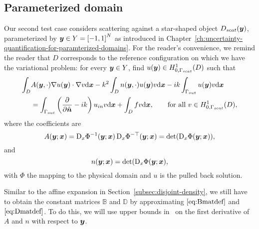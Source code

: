 \subsection{Parameterized domain}\label{subsec:parameterized-domain}
Our second test case considers scattering against a star-shaped object $D_{scat}({\bm{y}})$, parameterized by ${\bm{y}}\in Y = \left[ -1,1 \right]^N$ as introduced in Chapter~\ref{ch:uncertainty-quantification-for-paramterized-domains}.
For the reader's convenience, we remind the reader that $D$ corresponds to the reference configuration on which we have the variational problem: for every ${\bm{y}}\in Y$, find $u({\bm{y}}) \in H^1_{0, \Gamma_{scat}}(D)$ such that
\begin{align*}
    \int_{D}& A({\bm{y}},\cdot) \nabla u({\bm{y}}) \cdot \nabla v \mathrm{d}{{\bm{x}}} - k^2\int_{D} n({\bm{y}},\cdot) u({\bm{y}}) v \mathrm{d}{{\bm{x}}} - i k\int_{\Gamma_{out}}  u({\bm{y}}) v\mathrm{d}{{\bm{x}}} \\
    &= \int_{\Gamma_{out}} \left( \frac{\partial}{\partial \hat{\bm{n}}} -ik\right)u_{in} v\mathrm{d}{{\bm{x}}} +  \int_{D} f v\mathrm{d}{{\bm{x}}}, \nonumber
    \text{\qquad for all }v \in H^1_{0, \Gamma_{scat}}(D),
\end{align*}
where the coefficients are
\begin{equation*}
    A({\bm{y}}; {{\bm{x}}}) =  \mathop{}\!\mathrm{D}_x\Phi^{-1}({\bm{y}}; {{\bm{x}}}) \mathop{}\!\mathrm{D}_x\Phi^{-\top}({\bm{y}}; {{\bm{x}}})=\det(\mathop{}\!\mathrm{D}_x\Phi({\bm{y}}; {{\bm{x}}})),
\end{equation*}
and
\begin{equation*}
    n({\bm{y}}; {{\bm{x}}}) = \det(\mathop{}\!\mathrm{D}_x\Phi({\bm{y}}; {{\bm{x}}}),
\end{equation*}
with $\Phi$ the mapping to the physical domain and $u$ is the pulled back solution.

Similar to the affine expansion in Section~\ref{subsec:disjoint-density}, we still have to obtain the constant matrices $\mathbb{B}$ and $\mathbb{D}$ by approximating $\eqref{eq:Bmatdef}$ and $\eqref{eq:Dmatdef}$.
To do this, we will use upper bounds in~\cite{harbrecht2016} on the first derivative of $A$ and $n$ with respect to ${\bm{y}}$.

